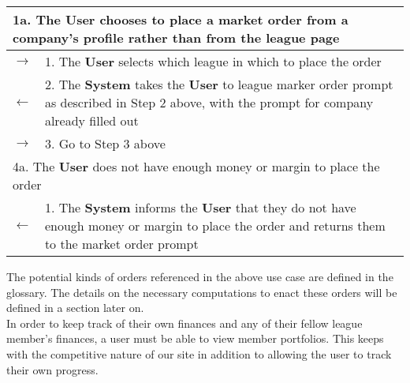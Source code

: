 \begin{centering}
\begin{longtable}{|p{1.2in} p{5in}|}
\multicolumn{2}{|p{6.2in}|}{1a. The \textbf{User} chooses to place a market order from a company's profile rather than from the league page} \\
\hline
$\rightarrow$ & 1. The \textbf{User} selects which league in which to place the order  \\
$\leftarrow$ & 2. The \textbf{System} takes the \textbf{User} to league marker order prompt as described in Step 2 above, with the prompt for company already filled out \\
$\rightarrow$ & 3. Go to Step 3 above \\
\hline
\multicolumn{2}{|p{6.2in}|}{4a. The \textbf{User} does not have enough money or margin to place the order} \\
\hline
$\leftarrow$ & 1. The \textbf{System} informs the \textbf{User} that they do not have enough money or margin to place the order and returns them to the market order prompt \\
\hline 
\end{longtable}
\end{centering}

The potential kinds of orders referenced in the above use case are defined in the glossary. The details on the necessary computations to enact these orders will be defined in a section later on. \\

In order to keep track of their own finances and any of their fellow league member's finances, a user must be able to view member portfolios. This keeps with the competitive nature of our site in addition to allowing the user to track their own progress. \\

